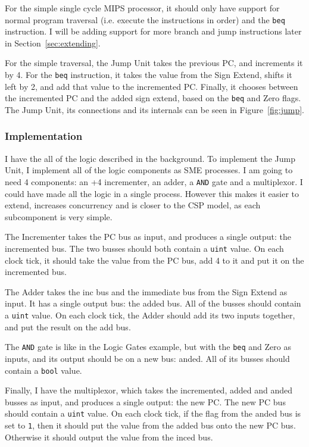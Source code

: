 For the simple single cycle MIPS processor, it should only have support for
normal program traversal (i.e. execute the instructions in order) and the
\texttt{beq} instruction. I will be adding support for more branch and jump
instructions later in Section~\ref{sec:extending}.

For the simple traversal, the Jump Unit takes the previous PC, and increments
it by 4. For the \texttt{beq} instruction, it takes the value from the Sign
Extend, shifts it left by 2, and add that value to the incremented PC. Finally,
it chooses between the incremented PC and the added sign extend, based on the
\texttt{beq} and Zero flags. The Jump Unit, its connections and its internals
can be seen in Figure~\ref{fig:jump}.

\subsubsection*{Implementation}
I have the all of the logic described in the background. To implement the Jump
Unit, I implement all of the logic components as SME processes. I am going
to need 4 components: an +4 incrementer, an adder, a \texttt{AND} gate and a
multiplexor. I could have made all the logic in a single process. However this
makes it easier to extend, increases concurrency and is closer to the CSP
model, as each subcomponent is very simple.

The Incrementer takes the PC bus as input, and produces a single output: the
incremented bus. The two busses should both contain a \texttt{uint} value. On
each clock tick, it should take the value from the PC bus, add 4 to it and put
it on the incremented bus.

The Adder takes the inc bus and the immediate bus from the Sign Extend as
input. It has a single output bus: the added bus. All of the busses should
contain a \texttt{uint} value. On each clock tick, the Adder should add its
two inputs together, and put the result on the add bus.

The \texttt{AND} gate is like in the Logic Gates example, but with the
\texttt{beq} and Zero as inputs, and its output should be on a new bus: anded.
All of its busses should contain a \texttt{bool} value.

Finally, I have the multiplexor, which takes the incremented, added and anded
busses as input, and produces a single output: the new PC. The new PC bus
should contain a \texttt{uint} value. On each clock tick, if the flag from the
anded bus is set to \texttt{1}, then it should put the value from the added bus
onto the new PC bus. Otherwise it should output the value from the inced bus.

